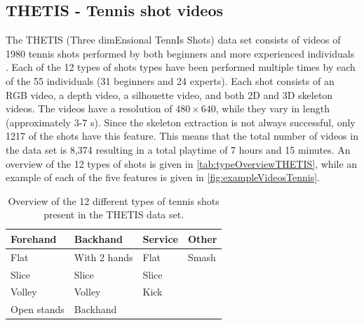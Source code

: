 \subsection{THETIS - Tennis shot videos}
The THETIS (Three dimEnsional TennIs Shots) data set consists of videos of 1980 tennis shots performed by both beginners and more experienced individuals \cite{Gourgari2013}. Each of the 12 types of shots types have been performed multiple times by each of the 55 individuals (31 beginners and 24 experts). Each shot consists of an RGB video, a depth video, a silhouette video, and both 2D and 3D skeleton videos. The videos have a resolution of $480\times 640$, while they vary in length (approximately 3-7 s). Since the skeleton extraction is not always successful, only 1217 of the shots have this feature. This means that the total number of videos in the data set is 8,374 resulting in a total playtime of 7 hours and 15 minutes. An overview of the 12 types of shots is given in \autoref{tab:typeOverviewTHETIS}, while an example of each of the five features is given in \autoref{fig:exampleVideosTennis}. 

\begin{table}
\centering
\caption{Overview of the 12 different types of tennis shots present in the THETIS data set.}
\label{tab:typeOverviewTHETIS}
\begin{tabular}{l|l|l|l}
\textbf{Forehand}    & \textbf{Backhand}     & \textbf{Service} & \textbf{Other} \\ \hline
Flat        & With 2 hands & Flat    & Smash \\
Slice       & Slice        & Slice   &       \\
Volley      & Volley       & Kick    &       \\
Open stands & Backhand     &         &      
\end{tabular}
\end{table}

